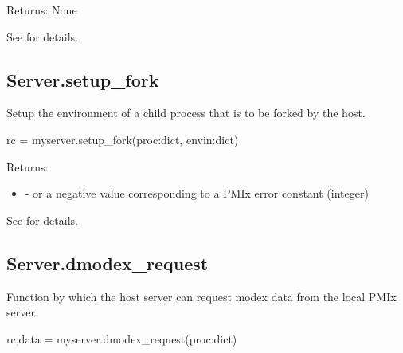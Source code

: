 \begin{arglist}
\end{arglist}

Returns: None

See  for details.


\subsection{Server.setup_fork}

\summary
Setup the environment of a child process that is to be forked
by the host.

\format

\pyspecificstart
\begin{codepar}
rc = myserver.setup_fork(proc:dict, envin:dict)
\end{codepar}
\pyspecificend


\begin{arglist}
\end{arglist}

Returns:

\begin{itemize}
    \item {} -  or a negative value corresponding to a PMIx error constant (integer)
\end{itemize}

See  for details.


\subsection{Server.dmodex_request}

\summary
Function by which the host server can request modex data from the local PMIx server.

\format

\pyspecificstart
\begin{codepar}
rc,data = myserver.dmodex_request(proc:dict)
\end{codepar}
\pyspecificend


